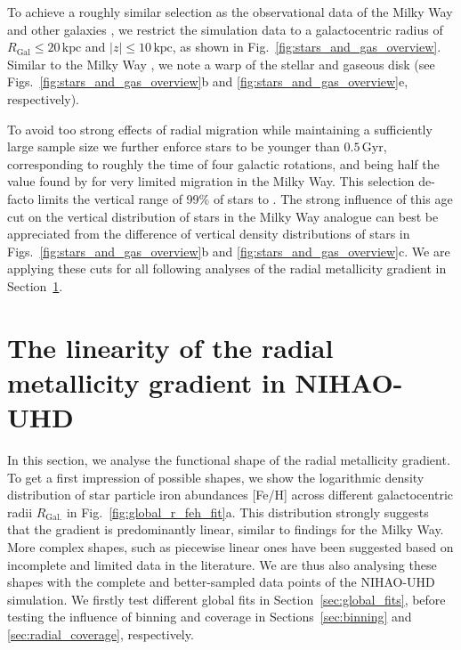 \documentclass[fleqn,usenatbib]{mnras}
\newcommand{\nihaoAGEmax}{$0.5\,\mathrm{Gyr}$}
\begin{document}
To achieve a roughly similar selection as the observational data of the Milky Way \citep{Genovali2014} and other galaxies \citep[e.g.][]{Chen2023}, we restrict the simulation data to a galactocentric radius of $R_\mathrm{Gal} \leq 20\,\mathrm{kpc}$ and $\vert z \vert \leq 10\,\mathrm{kpc}$, as shown in Fig.~\ref{fig:stars_and_gas_overview}. Similar to the Milky Way \citep{Poggio2018, Lemasle2022}, we note a warp of the stellar and gaseous disk (see Figs.~\ref{fig:stars_and_gas_overview}b and \ref{fig:stars_and_gas_overview}e, respectively).

To avoid too strong effects of radial migration \citep{Binney2008, Frankel2018, Grand2016, Minchev2018} while maintaining a sufficiently large sample size we further enforce stars to be younger than \nihaoAGEmax, corresponding to roughly the time of four galactic rotations, and being half the value found by \citet{Minchev2018} for very limited migration in the Milky Way. This selection de-facto limits the vertical range of 99\% of stars to . The strong influence of this age cut on the vertical distribution of stars in the Milky Way analogue can best be appreciated from the difference of vertical density distributions of stars in Figs.~\ref{fig:stars_and_gas_overview}b and \ref{fig:stars_and_gas_overview}c. We are applying these cuts for all following analyses of the radial metallicity gradient in Section~\ref{sec:linear_radial_metallicity_gradients}.

\section{The linearity of the radial metallicity gradient in NIHAO-UHD}
\label{sec:linear_radial_metallicity_gradients}

In this section, we analyse the functional shape of the radial metallicity gradient. To get a first impression of possible shapes, we show the logarithmic density distribution of star particle iron abundances [Fe/H] across different galactocentric radii $R_\mathrm{Gal.}$ in Fig.~\ref{fig:global_r_feh_fit}a. This distribution strongly suggests that the gradient is predominantly linear, similar to findings for the Milky Way. More complex shapes, such as piecewise linear ones have been suggested based on incomplete and limited data in the literature. We are thus also analysing these shapes with the complete and better-sampled data points of the NIHAO-UHD simulation. We firstly test different global fits in Section~\ref{sec:global_fits}, before testing the influence of binning and coverage in Sections~\ref{sec:binning} and \ref{sec:radial_coverage}, respectively.
\end{document}
